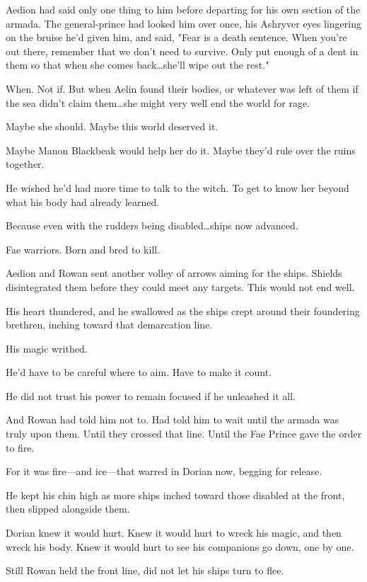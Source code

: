 Aedion had said only one thing to him before departing for his own section of the armada.
The general-prince had looked him over once, his Ashryver eyes lingering on the bruise he'd given him, and said, "Fear is a death sentence.
When you're out there, remember that we don't need to survive.
Only put enough of a dent in them so that when she comes back\ldots she'll wipe out the rest."

When.
Not if.
But when Aelin found their bodies, or whatever was left of them if the sea didn't claim them\ldots she might very well end the world for rage.

Maybe she should.
Maybe this world deserved it.

Maybe Manon Blackbeak would help her do it.
Maybe they'd rule over the ruins together.

He wished he'd had more time to talk to the witch.
To get to know her beyond what his body had already learned.

Because even with the rudders being disabled\ldots ships now advanced.

Fae warriors.
Born and bred to kill.

Aedion and Rowan sent another volley of arrows aiming for the ships.
Shields disintegrated them before they could meet any targets.
This would not end well.

His heart thundered, and he swallowed as the ships crept around their foundering brethren, inching toward that demarcation line.

His magic writhed.

He'd have to be careful where to aim.
Have to make it count.

He did not trust his power to remain focused if he unleashed it all.

And Rowan had told him not to.
Had told him to wait until the armada was truly upon them.
Until they crossed that line.
Until the Fae Prince gave the order to fire.

For it was fire---and ice---that warred in Dorian now, begging for release.

He kept his chin high as more ships inched toward those disabled at the front, then slipped alongside them.

Dorian knew it would hurt.
Knew it would hurt to wreck his magic, and then wreck his body.
Knew it would hurt to see his companions go down, one by one.

Still Rowan held the front line, did not let his ships turn to flee.

